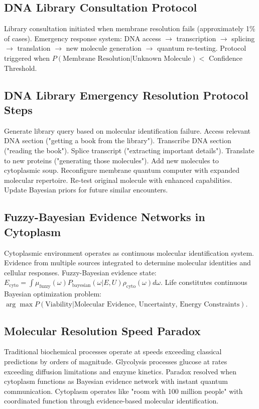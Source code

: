 \documentclass[12pt,a4paper]{article}
\begin{document}
\subsection{DNA Library Consultation Protocol}

Library consultation initiated when membrane resolution fails (approximately 1\% of cases). Emergency response system: DNA access $\to$ transcription $\to$ splicing $\to$ translation $\to$ new molecule generation $\to$ quantum re-testing. Protocol triggered when $P(\text{Membrane Resolution}|\text{Unknown Molecule}) <$ Confidence Threshold.

\subsection{DNA Library Emergency Resolution Protocol Steps}

Generate library query based on molecular identification failure. Access relevant DNA section ("getting a book from the library"). Transcribe DNA section ("reading the book"). Splice transcript ("extracting important details"). Translate to new proteins ("generating those molecules"). Add new molecules to cytoplasmic soup. Reconfigure membrane quantum computer with expanded molecular repertoire. Re-test original molecule with enhanced capabilities. Update Bayesian priors for future similar encounters.

\subsection{Fuzzy-Bayesian Evidence Networks in Cytoplasm}

Cytoplasmic environment operates as continuous molecular identification system. Evidence from multiple sources integrated to determine molecular identities and cellular responses. Fuzzy-Bayesian evidence state: $E_{\text{cyto}} = \int \mu_{\text{fuzzy}}(\omega) P_{\text{bayesian}}(\omega | E, U) \rho_{\text{cyto}}(\omega) d\omega$. Life constitutes continuous Bayesian optimization problem: $\arg \max P(\text{Viability} | \text{Molecular Evidence, Uncertainty, Energy Constraints})$.

\subsection{Molecular Resolution Speed Paradox}

Traditional biochemical processes operate at speeds exceeding classical predictions by orders of magnitude. Glycolysis processes glucose at rates exceeding diffusion limitations and enzyme kinetics. Paradox resolved when cytoplasm functions as Bayesian evidence network with instant quantum communication. Cytoplasm operates like "room with 100 million people" with coordinated function through evidence-based molecular identification.
\end{document}
